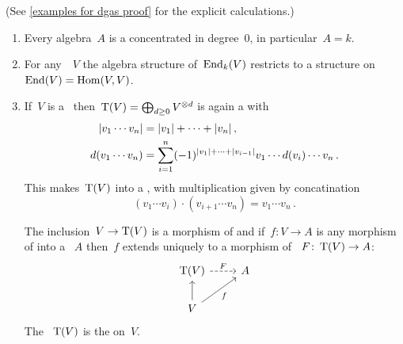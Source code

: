 \documentclass[a4paper,10pt,headings=standardclasses]{scrartcl}
\begin{document}
\begin{examples}
  \label{examples for dgas}
  (See \cref{examples for dgas proof} for the explicit calculations.)
  \begin{enumerate}
    \item
      Every algebra~$A$ is a {\dga} concentrated in degree~$0$, in particular~$A = k$.
    \item
      For any~{\dgv}~$V$ the algebra structure of~$\operatorname{End}_k(V)$ restricts to a {\dga} structure on~$\operatorname{End}(V) = \operatorname{Hom}(V,V)$.
    \item
      If~$V$ is a~{\dgv} then~$\operatorname{T}(V) = \bigoplus_{d \geq 0} V^{\otimes d}$ is again a {\dgv} with
      \begin{align*}
        \lvert v_1 \dotsm v_n\rvert
        &=
        \lvert v_1\rvert + \dotsb + \lvert v_n\rvert \,,
      \\
        d(v_1 \dotsm v_n)
        &=
        \sum_{i=1}^n
        (-1)^{\lvert v_1\rvert + \dotsb + \lvert v_{i-1}\rvert}
        v_1 \dotsm d(v_i) \dotsm v_n \,.
      \end{align*}
      This makes~$\operatorname{T}(V)$ into a {\dga}, with multiplication given by concatination
      \[
        (v_1 \dotsm v_i) \cdot (v_{i+1} \dotsm v_n)
        =
        v_1 \dotsm v_n \,.
      \]

      The inclusion~$V \to \operatorname{T}(V)$ is a morphism of {\dgvs} and if~$f \colon V \to A$ is any morphism of {\dgvs} into a {\dga}~$A$ then~$f$ extends uniquely to a morphism of {\dgas}~$F \colon \operatorname{T}(V) \to A$:
      \[
        \begin{tikzcd}
          \dgTensor(V)
          \arrow[dashed]{r}[above]{F}
          &
          A
          \\
          V
          \arrow{u}
          \arrow{ur}[below right]{f}
          &
          {}
        \end{tikzcd}
      \]
      The {\dga}~$\operatorname{T}(V)$ is the  on~$V$.
  \end{enumerate}
\end{examples}
\end{document}
